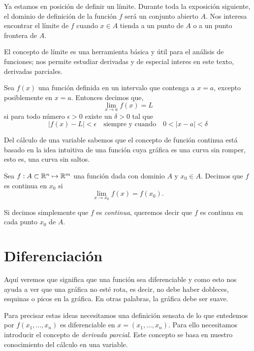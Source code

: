 Ya estamos en posición de definir un límite. Durante toda la exposición siguiente, el dominio de definición de la función $f$ será un conjunto abierto $A$.
Nos interesa encontrar el límite de $f$ cuando $x \in A$ tienda a un punto de $A$ o a un punto frontera de $A$.

El concepto de límite es una herramienta básica y útil para el análisis de funciones; nos permite estudiar derivadas y de especial interes en este texto,
derivadas parciales.

\begin{definition}[Límite]
    Sea $f(x)$ una función definida en un intervalo que contenga a $x=a$, excepto posiblemente en $x=a$. Entonces decimos que,
    $$\lim_{x \rightarrow a} f(x) = L$$
    si para todo n\'umero $\epsilon > 0$ existe un $\delta > 0$ tal que
    $$ |f(x)-L| < \epsilon \quad \text{siempre y cuando} \quad 0 < |x-a|< \delta $$
\end{definition}

Del cálculo de una variable sabemos que el concepto de función continua está basado en la idea intuitiva de una función cuya gráfica es una
curva sin romper, esto es, una curva sin saltos.

\begin{definition}
    Sea $f:A \subset \mathbb{R}^{n} \mapsto \mathbb{R}^{m}$ una función dada con dominio $A$ y $x_{0} \in A$. Decimos que $f$ es continua
    en $x_{0}$ si
    $$ \lim_{x \rightarrow x_{0}} f(x) = f(x_{0})\text{.}$$
\end{definition}

Si decimos simplemente que $f$ es \emph{continua}, queremos decir que $f$ es continua
en cada punto $x_{0}$ de $A$.

\section{Diferenciación}

Aquí veremos que significa que una función sea diferenciable y como
esto nos ayuda a ver que una gráfica no esté rota, es decir, no debe haber dobleces, esquinas o picos en la gráfica. En otras palabras, la gráfica 
debe ser suave.

Para precisar estas ideas necesitamos una definición sensata de lo que entedemos por $f(x_{1}, \ldots, x_{n})$ es diferenciable en $x=(x_{1}, \ldots, x_{n})$.
Para ello necesitamos introducir el concepto de \emph{derivada parcial}. Este concepto se
basa en nuestro conocimiento del cálculo en una variable.

